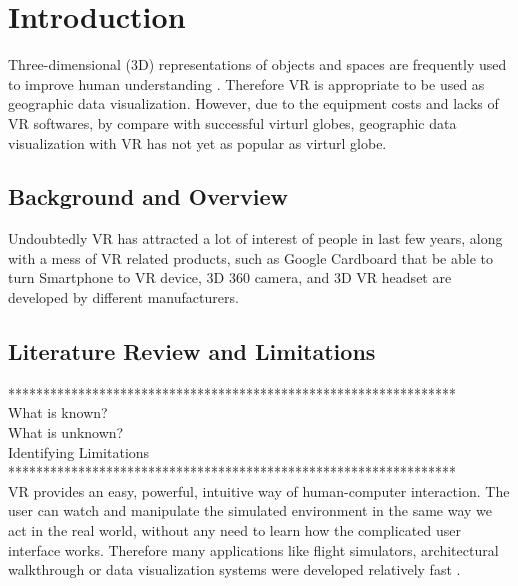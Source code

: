 \label{chapter-introduction}
\chapter{Introduction}

Three-dimensional (3D) representations of objects and spaces are frequently used to improve human understanding \parencite{tuttle.virtual-globes.2008}. Therefore VR is appropriate to be used as geographic data visualization.  However, due to the equipment costs and lacks of VR softwares, by compare with successful virturl globes, geographic data visualization with VR has not yet as popular as virturl globe. 

\section{Background and Overview}

Undoubtedly VR has attracted a lot of interest of people in last few years, along with a mess of VR related products, such as Google Cardboard that be able to turn Smartphone to VR device, 3D 360 camera, and 3D VR headset are developed by different manufacturers. 

\section{Literature Review and Limitations}

****************************************************************\\%
What is known?\\
What is unknown?\\
Identifying Limitations\\

****************************************************************\\%
VR provides an easy, powerful, intuitive way of human-computer interaction. The user can watch and manipulate the simulated environment in the same way we act in the real world, without any need to learn how the complicated user interface works. Therefore many applications like flight simulators, architectural walkthrough or data visualization systems were developed relatively fast \parencite{mazuryk.virtual-reality.1996}.


